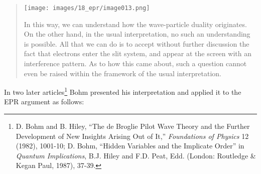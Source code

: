 \documentclass[11pt]{memoir}
\begin{document}
\begin{quote}
\texttt{[image: images/18\_epr/image013.png]}

In this way, we can understand how the wave-particle duality originates.
On the other hand, in the usual interpretation, no such an understanding
is possible. All that we can do is to accept without further discussion
the fact that electrons enter the slit system, and appear at the screen
with an interference pattern. As to how this came about, such a question
cannot even be raised within the framework of the usual interpretation.
\end{quote}

In two later articles\footnote{D. Bohm and B. Hiley, ``The de Broglie
  Pilot Wave Theory and the Further Development of New Insights Arising
  Out of It,'' \emph{Foundations of Physics} 12 (1982), 1001-10; D.
  Bohm, ``Hidden Variables and the Implicate Order'' in \emph{Quantum
  Implications}, B.J. Hiley and F.D. Peat, Edd. (London: Routledge \&
  Kegan Paul, 1987), 37-39.} Bohm presented his interpretation and
applied it to the EPR argument as follows:
\end{document}
